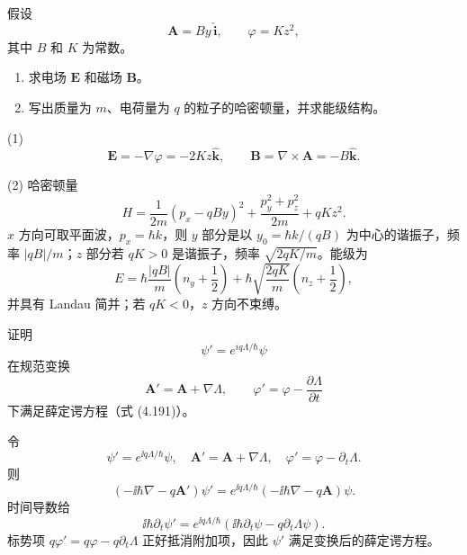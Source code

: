 \begin{question}
假设
\[
\mathbf A=B y\,\hat{\mathbf i},\qquad \varphi=Kz^2,
\]
其中 $B$ 和 $K$ 为常数。
\begin{enumerate}
\item 求电场 $\mathbf E$ 和磁场 $\mathbf B$。
\item 写出质量为 $m$、电荷量为 $q$ 的粒子的哈密顿量，并求能级结构。
\end{enumerate}
\end{question}
\begin{solution}

(1) 
\[
\mathbf E=-\nabla\varphi=-2Kz\hat{\mathbf k},
\qquad
\mathbf B=\nabla\times\mathbf A=-B\hat{\mathbf k}.
\]

(2) 哈密顿量
\[
H=\frac{1}{2m}(p_x-qBy)^2+\frac{p_y^2+p_z^2}{2m}+qKz^2.
\]
$x$ 方向可取平面波，$p_x=\hbar k$，则 $y$ 部分是以 $y_0=\hbar k/(qB)$ 为中心的谐振子，频率 $|qB|/m$；$z$ 部分若 $qK>0$ 是谐振子，频率 $\sqrt{2qK/m}$。能级为
\[
E=\hbar\frac{|qB|}{m}\left(n_y+\frac12\right)+\hbar\sqrt{\frac{2qK}{m}}\left(n_z+\frac12\right),
\]
并具有 Landau 简并；若 $qK<0$，$z$ 方向不束缚。

\end{solution}

\begin{question}
证明
\[
\psi'=e^{iq\Lambda/\hbar}\psi
\]
在规范变换
\[
\mathbf A'=\mathbf A+\nabla\Lambda,
\qquad \varphi'=\varphi-\frac{\partial\Lambda}{\partial t}
\]
下满足薛定谔方程（式 (4.191)）。

\par\smallskip
{}

\end{question}
\begin{solution}

令
\[
\psi'=e^{\ii q\Lambda/\hbar}\psi,
\quad
\mathbf A'=\mathbf A+\nabla\Lambda,
\quad
\varphi'=\varphi-\partial_t\Lambda.
\]
则
\[
(-\ii\hbar\nabla-q\mathbf A')\psi'
=e^{\ii q\Lambda/\hbar}(-\ii\hbar\nabla-q\mathbf A)\psi.
\]
时间导数给
\[
\ii\hbar\partial_t\psi'=e^{\ii q\Lambda/\hbar}(\ii\hbar\partial_t\psi-q\partial_t\Lambda\psi).
\]
标势项 $q\varphi'=q\varphi-q\partial_t\Lambda$ 正好抵消附加项，因此 $\psi'$ 满足变换后的薛定谔方程。

\end{solution}

